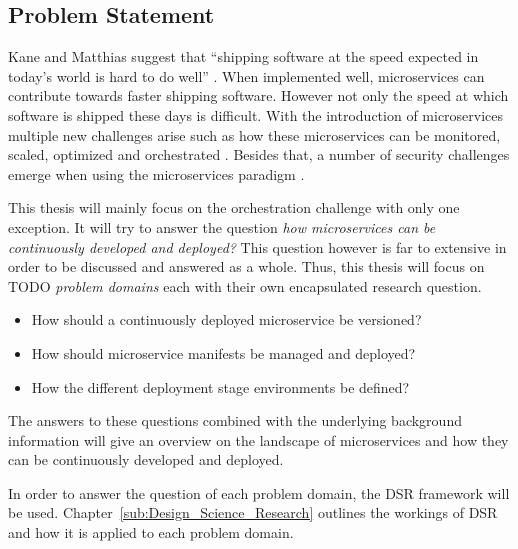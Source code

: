 
\subsection{Problem Statement}%
\label{sub:Problem_Statement}

Kane and Matthias suggest that \enquote{shipping software at the speed expected
in today's world is hard to do well} \autocite[p.
2]{SeanPKaneDocker&Running2018}. When implemented well, microservices can
contribute towards faster shipping software. However not only the speed at
which software is shipped these days is difficult. With the introduction of
microservices multiple new challenges arise such as how these microservices can
be monitored, scaled, optimized and orchestrated \autocite[p.
67]{TrihinasDevOpsasService2018}. Besides that, a number of security challenges
emerge when using the microservices paradigm
\autocite{YaryginaOvercomingSecurityChallenges2018}.

This thesis will mainly focus on the orchestration challenge with only one
exception. It will try to answer the question \textit{how microservices can be
continuously developed and deployed?} This question however is far to extensive
in order to be discussed and answered as a whole. Thus, this thesis will focus
on TODO \textit{problem domains} each with their own encapsulated research
question.

\label{link:problem_domains}
\begin{itemize}
  \item How should a continuously deployed microservice be versioned?
  \item How should microservice manifests be managed and deployed?
  \item How the different deployment stage environments be defined?
\end{itemize}

The answers to these questions combined with the underlying background
information will give an overview on the landscape of microservices and how
they can be continuously developed and deployed.

In order to answer the question of each problem domain, the \ac{DSR} framework
will be used. Chapter~\ref{sub:Design_Science_Research} outlines the workings
of \ac{DSR} and how it is applied to each problem domain.
